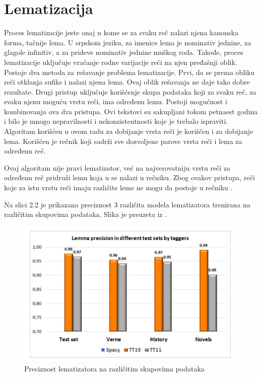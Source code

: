\documentclass[12pt,oneside]{memoir}
\begin{document}
\section{Lematizacija}

Proces lematizacije jeste onaj u kome se za svaku reč nalazi njena kanonska forma, tačnije lema. U srpskom jeziku,  za imenice lema je nominativ jednine,  za glagole infinitiv,  a za prideve nominativ jednine muškog roda. Takođe,  proces lematizacije uključuje vraćanje rodne varijacije reči na njen pređašnji oblik. 
Postoje dva metoda za rešavanje problema lematizacije.  Prvi,  da se prema obliku reči otklanja sufiks i nalazi njena lema.  Ovaj oblik rešavanja ne daje tako dobre rezultate.  Drugi pristup uključuje korišćenje skupa podataka koji za svaku reč,  za svaku njenu moguću vrstu reči,  ima određenu lemu.  Postoji mogućnost i kombinovanja ova dva pristupa.  Ovi tekstovi su sakupljani tokom petnaest godina i bilo je mnogo nepravilnosti i nekonzistentnosti koje je trebalo ispraviti. 
Algoritam korišćen u ovom radu za dobijanje vrsta reči je koriščen i za dobijanje lema.  Korišćen je rečnik koji sadrži sve dozvoljene parove vrsta reči i lema za određenu reč.  

Ovaj algoritam nije pravi lematizator,  već na najverovatniju vrstu reči za određenu reč pridruži lemu koja u se nalazi u rečniku.  Zbog ovakov pristupa,  reči koje za istu vrstu reči imaju različite leme ne mogu da postoje u rečniku \cite{tagger}.

Na slici 2.2 je prikazana preciznost 3 različita modela lematizatora trenirana na različitim skupovima podataka.  Slika je preuzeta iz \cite{tagger}.

\begin{figure}[h!]
\centering
\includegraphics[width=.7\textwidth]{images/lemmatization.png}
\caption{Preciznost lematizatora na različitim skupovima podataka }
\label{Slika}
\end{figure}
\end{document}
